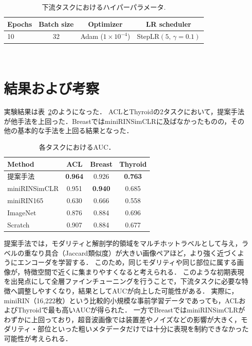 \begin{table}[t]
  \centering
  \caption{下流タスクにおけるハイパーパラメータ.}
  \label{tab:downstream}
  \small
  \begin{tabular}{lccc}
    \toprule
    \textbf{Epochs} & \textbf{Batch size} & \textbf{Optimizer} & \textbf{LR scheduler} \\
    \midrule
    10 & 32 & Adam ($1{\times}10^{-4}$) & StepLR$(5,\,\gamma{=}0.1)$ \\
    \bottomrule
  \end{tabular}\\[2pt]
  \footnotesize
\end{table}

\section{結果および考察}
実験結果は表~\ref{tab:finetune_auc}のようになった．
ACLとThyroidの2タスクにおいて，提案手法が他手法を上回った．BreastではminiRINSimCLRに及ばなかったものの，その他の基本的な手法を上回る結果となった．

\begin{table}[t]
  \centering
  \caption{各タスクにおけるAUC．}
  \label{tab:finetune_auc}
  \begin{tabular}{lccc}
    \toprule
    Method & ACL & Breast & Thyroid \\
    \midrule
    提案手法 & {\bf 0.964} & 0.926 & {\bf 0.763} \\
    miniRINSimCLR   & 0.951 & {\bf 0.940} & 0.685 \\
    miniRIN165      & 0.630 & 0.666 & 0.558 \\
    ImageNet        & 0.876 & 0.884 & 0.696 \\
    Scratch         & 0.907 & 0.884 & 0.677 \\
    \bottomrule
  \end{tabular}
\end{table}

提案手法では，モダリティと解剖学的領域をマルチホットラベルとして与え，ラベルの重なり具合（Jaccard類似度）が大きい画像ペアほど，より強く近づくようにエンコーダを学習する．
このため，同じモダリティや同じ部位に属する画像が，特徴空間で近くに集まりやすくなると考えられる．
このような初期表現を出発点にして全層ファインチューニングを行うことで，下流タスクに必要な特徴へ調整しやすくなり，結果としてAUCが向上した可能性がある．
実際に，miniRIN（16{,}222枚）という比較的小規模な事前学習データであっても，ACLおよびThyroidで最も高いAUCが得られた．
一方でBreastではminiRINSimCLRがわずかに上回っており，超音波画像では装置差やノイズなどの影響が大きく，モダリティ・部位といった粗いメタデータだけでは十分に表現を制約できなかった可能性が考えられる．

